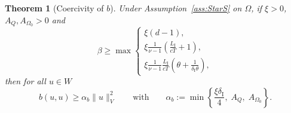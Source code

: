 \documentclass[a4paper]{article}
\theoremstyle{plain}
\newtheorem{theorem}{Theorem}[section]
\theoremstyle{definition}
\newcommand{\LI}{L_{\mathrm I}}
\newcommand{\deltaI}{{\delta_{\mathrm I}}}
\newcommand{\OZ}{{\Omega_0}}
\begin{document}
\begin{theorem}[Coercivity of $b$]\label{thm:coerc_b}
	Under Assumption~\ref{ass:StarS} on $\Omega$, if $\xi > 0$, $A_Q, A_\OZ > 0$ and
	\begin{equation}
		\label{eq:coefficient_coercivity_cond}
		\beta \geq \max
		\begin{cases}
			\xi(d-1),                                               \\
			\xi\frac{1}{\nu - 1}\left(\frac{\LI}{cT}+ 1\right), \\
			\xi\frac{1}{\nu - 1}\frac{\LI}{cT}\left(\theta + \frac1{\deltaI \theta}\right),
		\end{cases}
	\end{equation}
	then for all $u \in W$
	\begin{equation} \label{eq:coercivity_condition}
		b(u,u) \geq {\alpha_b} \|u\|_V^2
		\qquad \text{with}\qquad
		\alpha_b := \min \left\{\frac{\xi\deltaI}{4}, \; A_Q, \; A_\OZ\right\}.
	\end{equation}
\end{theorem}
\end{document}
